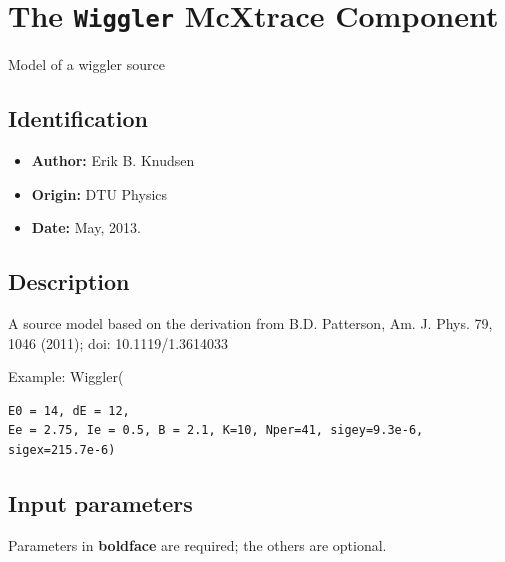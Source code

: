 \section{The \texttt{Wiggler} McXtrace Component}
Model of a wiggler source

\subsection*{Identification}
\begin{itemize}
  \item \textbf{Author:} Erik B. Knudsen
  \item \textbf{Origin:} DTU Physics
  \item \textbf{Date:} May, 2013.
\end{itemize}

\subsection*{Description}
A source model based on the derivation from B.D. Patterson, Am. J. Phys. 79, 1046 (2011); doi: 10.1119/1.3614033

Example: Wiggler(

\begin{verbatim}
E0 = 14, dE = 12,
Ee = 2.75, Ie = 0.5, B = 2.1, K=10, Nper=41, sigey=9.3e-6, sigex=215.7e-6)
\end{verbatim}

\subsection*{Input parameters}
Parameters in \textbf{boldface} are required; the others are optional.

